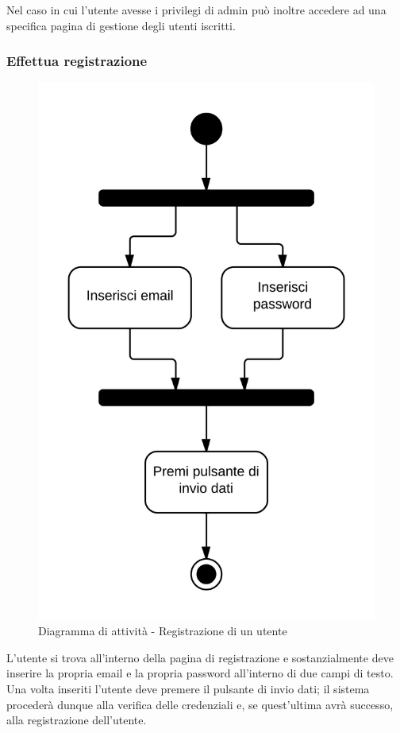 Nel caso in cui l'utente avesse i privilegi di admin può inoltre accedere ad una specifica pagina di gestione degli utenti iscritti.

\subsubsection{Effettua registrazione}

\begin{figure}[H]
\centering
\includegraphics[scale=0.1]{uml/MaaP - Effettua registrazione.png}
\caption{Diagramma di attività - Registrazione di un utente}
\end{figure}

L'utente si trova all'interno della pagina di registrazione e sostanzialmente deve inserire la propria email e la propria password all'interno di due campi di testo. Una volta inseriti l'utente deve premere il pulsante di invio dati; il sistema  procederà dunque alla verifica delle credenziali e, se quest'ultima avrà successo, alla registrazione dell'utente.


